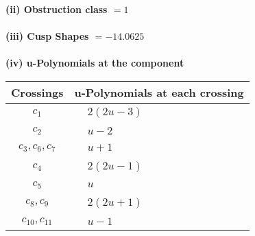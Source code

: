 \documentclass[1p]{elsarticle_modified}
\theoremstyle{definition}
\begin{document}
\flushleft \textbf{(ii) Obstruction class $= 1$}\\~\\
\flushleft \textbf{(iii) Cusp Shapes $= -14.0625$}\\~\\
\newpage\renewcommand{\arraystretch}{1}
\flushleft \textbf{(iv) u-Polynomials at the component}\newline \\
\begin{tabular}{m{50pt}|m{274pt}}
Crossings & \hspace{64pt}u-Polynomials at each crossing \\
\hline $$\begin{aligned}c_{1}\end{aligned}$$&$\begin{aligned}
&2(2 u-3)
\end{aligned}$\\
\hline $$\begin{aligned}c_{2}\end{aligned}$$&$\begin{aligned}
&u-2
\end{aligned}$\\
\hline $$\begin{aligned}c_{3},c_{6},c_{7}\end{aligned}$$&$\begin{aligned}
&u+1
\end{aligned}$\\
\hline $$\begin{aligned}c_{4}\end{aligned}$$&$\begin{aligned}
&2(2 u-1)
\end{aligned}$\\
\hline $$\begin{aligned}c_{5}\end{aligned}$$&$\begin{aligned}
&u
\end{aligned}$\\
\hline $$\begin{aligned}c_{8},c_{9}\end{aligned}$$&$\begin{aligned}
&2(2 u+1)
\end{aligned}$\\
\hline $$\begin{aligned}c_{10},c_{11}\end{aligned}$$&$\begin{aligned}
&u-1
\end{aligned}$\\
\hline
\end{tabular}\\~\\
\end{document}
